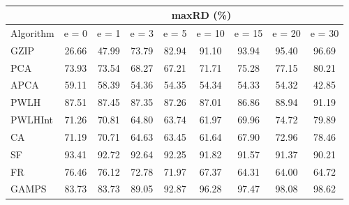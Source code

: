 \begin{table}[h]
\newcommand{\cpca}{\cellcolor{cyan!20}}
\newcommand{\capca}{\cellcolor{green!20}}
\newcommand{\cfr}{\cellcolor{yellow!25}}
\newcommand{\cgzip}{\cellcolor{orange!20}}
\newcommand{\cca}{\cellcolor{violet!20}}
\newcommand{\best}{\cellcolor{gray!30}}
\centering\hspace*{0cm}\begin{tabular}{| l | c | c | c | c | c | c | c | c |}\cline{2-9}\multicolumn{1}{c|}{}& \multicolumn{8}{c|}{maxRD (\%)}\\\hline
{Algorithm} & {e = 0} & {e = 1} & {e = 3} & {e = 5} & {e = 10} & {e = 15} & {e = 20} & {e = 30} \\\hline
{GZIP\cgzip} & {\best26.66} & {\best47.99} & {73.79} & {82.94} & {91.10} & {93.94} & {95.40} & {96.69} \\\hline
{PCA\cpca} & {73.93} & {73.54} & {68.27} & {67.21} & {71.71} & {75.28} & {77.15} & {80.21} \\\hline
{APCA\capca} & {59.11} & {58.39} & {\best54.36} & {\best54.35} & {\best54.34} & {\best54.33} & {\best54.32} & {\best42.85} \\\hline
{PWLH} & {87.51} & {87.45} & {87.35} & {87.26} & {87.01} & {86.86} & {88.94} & {91.19} \\\hline
{PWLHInt} & {71.26} & {70.81} & {64.80} & {63.74} & {61.97} & {69.96} & {74.72} & {79.89} \\\hline
{CA} & {71.19} & {70.71} & {64.63} & {63.45} & {61.64} & {67.90} & {72.96} & {78.46} \\\hline
{SF} & {93.41} & {92.72} & {92.64} & {92.25} & {91.82} & {91.57} & {91.37} & {90.21} \\\hline
{FR\cfr} & {76.46} & {76.12} & {72.78} & {71.97} & {67.37} & {64.31} & {64.00} & {64.72} \\\hline
{GAMPS} & {83.73} & {83.73} & {89.05} & {92.87} & {96.28} & {97.47} & {98.08} & {98.62} \\\hline
\end{tabular}
\caption{\captionminmaxtwo}
\label{experiments:minmaxtwo}
\end{table}
